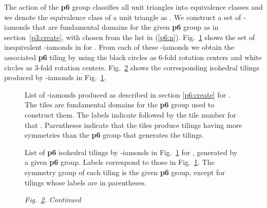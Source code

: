 \documentclass{ws-ijcga}
\begin{document}
The action of the {\bf p6} group classifies all unit triangles into  equivalence classes and we denote
the equivalence class of a unit triangle  as . 
We construct a set  of -iamonds that are
fundamental domains for the given {\bf p6} group as in section~\ref{p3:create}, 
with  chosen from the list in (\ref{p6:n}). 
Fig.~\ref{p6fighi} shows the set of inequivalent -iamonds in 
for . 
From each of these -iamonds we obtain the associated {\bf p6} tiling 
by using the black circles as 6-fold rotation centers
and white circles as 3-fold rotation centers. 
Fig.~\ref{p6tiling} shows the corresponding isohedral tilings 
produced by -iamonds in Fig.~\ref{p6fighi}.
\begin{figure}\centerline{
}
\vspace*{8pt}
\caption{
List of -iamonds produced as described in section \ref{p6:create} for . 
The tiles are fundamental domains for the {\bf p6} group used to construct them. 
The labels indicate  followed by the tile number for that . 
Parentheses indicate that the tiles produce tilings having more symmetries than the {\bf p6} group that generates the tilings.
\label{p6fighi}
}
\end{figure}
\begin{figure}\centerline{
}
\vspace*{8pt}
\caption{
List of {\bf p6} isohedral tilings by -iamonds in Fig.~\ref{p6fighi} for , 
generated by a given {\bf p6} group. 
Labels correspond to those in Fig.~\ref{p6fighi}. 
The symmetry group of each tiling is the given {\bf p6} group, 
except for tilings whose labels are in parentheses.
\label{p6tiling}
}
\end{figure}
\begin{figure}\centerline{
}
\vspace*{8pt}
\fontsize{8pt}{0pt}\selectfont
    {\it Fig.~\ref{p6tiling}.} {\it Continued}
\end{figure}
\end{document}
